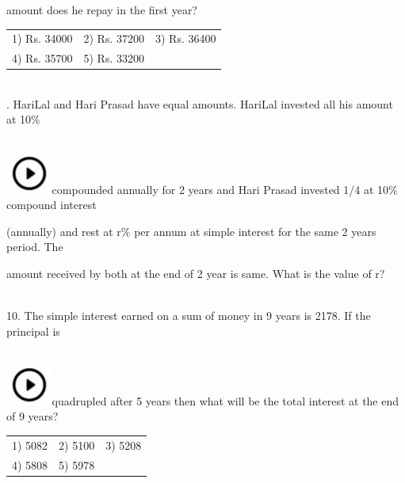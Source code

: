 \documentclass{article}
\begin{document}
	\noindent amount does he repay in the first year?
	
	\noindent 
	
	\noindent \begin{tabular}{p{1.7in} p{1.6in} p{1.6in}} \\ 
 1) Rs. 34000           & 2) Rs. 37200     & 3) Rs. 36400     \\
4) Rs. 35700    & 5) Rs. 33200 \\
\end{tabular}
	
	\noindent 
	
	\noindent 
	
	\noindent  \\ 
	
	.   HariLal and Hari Prasad have equal amounts. HariLal invested all his amount at 10\%
	
	\noindent  
	 
	\noindent \\ \includegraphics*[width=0.60in, height=0.52in]{images/image1}compounded annually for 2 years and Hari Prasad invested 1/4 at 10\% compound interest
	
	\noindent (annually) and rest at r\% per annum at simple interest for the same 2 years period. The
	
	\noindent 
	
	\noindent amount received by both at the end of 2 year is same. What is the value of r?
	
	\noindent  \\ 
	
	10. The  simple  interest  earned  on  a  sum  of  money  in  9  years  is  2178.  If  the  principal  is  
	 
	\noindent \\ \includegraphics*[width=0.60in, height=0.52in]{images/image1}quadrupled after 5 years then what will be the total interest at the end of 9 years?
	
	\noindent \begin{tabular}{p{1.7in} p{1.6in} p{1.6in}} \\ 
 1) 5082                    & 2) 5100             & 3) 5208             \\
4) 5808             & 5) 5978 \\
\end{tabular}
	
\end{document}
